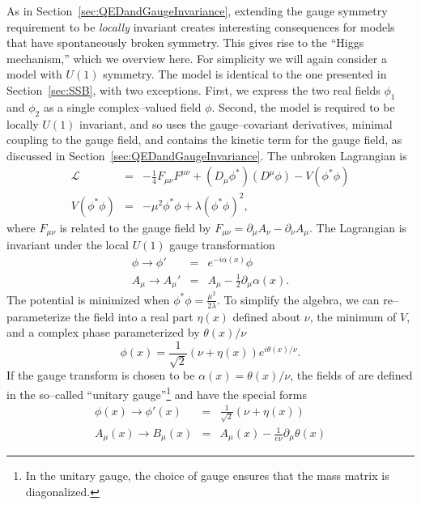 As in Section~\ref{sec:QEDandGaugeInvariance}, extending the gauge symmetry
requirement to be \emph{locally} invariant creates interesting consequences for
models that have spontaneously broken symmetry.  This gives rise to the ``Higgs
mechanism,'' which we overview here.  For simplicity we will again consider a
model with $U(1)$ symmetry.  The model is identical to the one presented in
Section~\ref{sec:SSB}, with two exceptions. First, we express the two real
fields $\phi_1$ and $\phi_2$ as a single complex--valued field $\phi$.  Second,
the model is required to be locally $U(1)$ invariant, and so uses the
gauge--covariant derivatives, minimal coupling to the gauge field, and contains
the kinetic term for the gauge field, as discussed in
Section~\ref{sec:QEDandGaugeInvariance}.  The unbroken Lagrangian is
\begin{eqnarray}
  \mathcal{L} &=& -\frac{1}{4} F_{\mu\nu}F^{\mu\nu} 
  + (D_\mu \phi^*)(D^\mu \phi) - V(\phi^*\phi) \label{eq:LocalInvariantU1} \\
  V(\phi^*\phi) &=& -\mu^2 \phi^*\phi + \lambda (\phi^*\phi)^2,
  \label{eq:PotentialLocalInvariantU1}
\end{eqnarray}
where $F_{\mu\nu}$ is related to the gauge field by $F_{\mu\nu} = \partial_\mu
A_\nu - \partial_\nu A_\mu$.  The Lagrangian is invariant under the local $U(1)$
gauge transformation
\begin{eqnarray}
  \phi \to \phi' &=& e^{-i \alpha(x)} \phi \nonumber \\
  A_\mu \to A_\mu' &=& A_\mu - \frac{1}{2} \partial_\mu \alpha(x).
  \nonumber
\end{eqnarray}
The potential is minimized when $\phi^*\phi = \frac{\mu^2}{2\lambda}$.  To
simplify the algebra, we can
re--parameterize the field into a real part $\eta(x)$ defined about $\nu$, the minimum of $V$, 
and a complex phase parameterized by $\theta(x)/\nu$
\begin{equation}
  \phi(x) = \frac{1}{\sqrt 2}(\nu + \eta(x))e^{i \theta(x)/\nu}.
  \label{eq:HiggsMechanismFieldParameterization}
\end{equation}
If the gauge transform is chosen to be $\alpha(x) = \theta(x)/\nu$, the fields
of are defined in the
so--called ``unitary gauge''\footnote{In the unitary gauge, the choice of gauge
ensures that the mass matrix is diagonalized.} and have the special forms
\begin{eqnarray}
  \phi(x) \to \phi'(x) &=& \frac{1}{\sqrt 2}(\nu + \eta(x)) \nonumber \\
  A_\mu(x) \to B_\mu(x) &=& A_\mu(x) - \frac{1}{e \nu}\partial_\mu \theta(x)
  \label{eq:AfterUnitaryGaugeTransformation}
\end{eqnarray}
